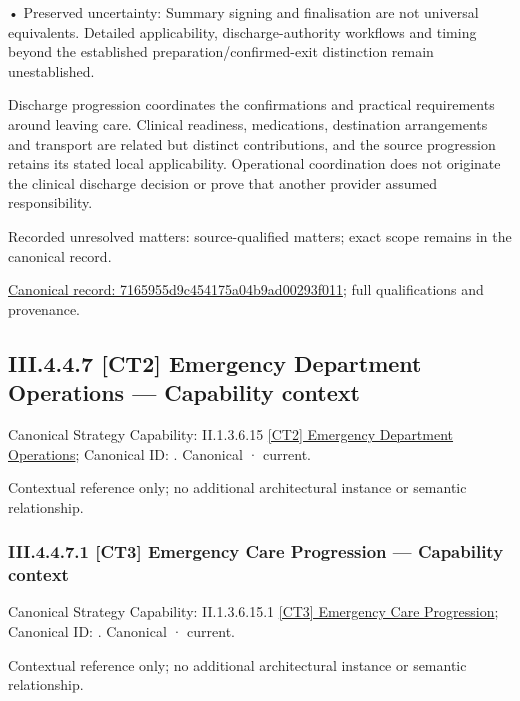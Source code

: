•
Preserved uncertainty: Summary signing and finalisation are not universal equivalents. Detailed applicability, discharge-authority workflows and timing beyond the established preparation/confirmed-exit distinction remain unestablished.



Discharge progression coordinates the confirmations and practical requirements around leaving care. Clinical readiness, medications, destination arrangements and transport are related but distinct contributions, and the source progression retains its stated local applicability. Operational coordination does not originate the clinical discharge decision or prove that another provider assumed responsibility.


{\small Recorded unresolved matters: source-qualified matters; exact scope remains in the canonical record.}\par
{\footnotesize \href{../../../../continuum/business/business-process/7165955d9c454175a04b9ad00293f011.md}{Canonical record: 7165955d9c454175a04b9ad00293f011}; full qualifications and provenance.}\par
\subsection*{III.4.4.7 [CT2] Emergency Department Operations — Capability context}
\label{navigation:III.4.4.7}

{\small Canonical Strategy Capability: II.1.3.6.15 \hyperref[element:24a4b5815faa4d369bc756a6e97d3e9e]{[CT2] Emergency Department Operations}; Canonical ID: \texttt{}. Canonical · current.}\par
Contextual reference only; no additional architectural instance or semantic relationship.\par
\subsubsection*{III.4.4.7.1 [CT3] Emergency Care Progression — Capability context}
\label{navigation:III.4.4.7.1}

{\small Canonical Strategy Capability: II.1.3.6.15.1 \hyperref[element:7125e459a48946d0ba075b5ecc3571b4]{[CT3] Emergency Care Progression}; Canonical ID: \texttt{}. Canonical · current.}\par
Contextual reference only; no additional architectural instance or semantic relationship.\par
